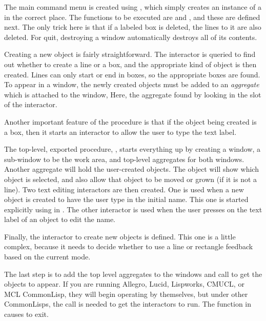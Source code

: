 The main command menu is created using , which simply
creates an instance of a  in the
correct place.  The functions to be executed are  and
, and these are defined next.  The only trick here is that if a
labeled box is deleted, the lines to it are also deleted.  For quit,
destroying a window automatically destroys all of its contents.

Creating a new object is fairly straightforward.  The interactor is queried
to find out whether to create a line or a box, and the appropriate kind of
object is then created.  Lines can only start or end in boxes, so the
appropriate boxes are found.  To appear in a window, the newly created
objects must be added to an {\it aggregate} which is attached to the window,
Here, the aggregate found by looking in the  slot of
the interactor.

Another important feature of the  procedure is that if
the object being created is a box, then it starts an interactor to allow
the user to type the text label.

The top-level, exported procedure, , starts everything up by
creating a window,
a sub-window to be the work area, and top-level aggregates for both
windows.  Another aggregate will hold the user-created objects.  The
 object will show which object is selected, and also allow
that object to be moved or grown (if it is not a line).  Two text editing
interactors are then created.  One is used when a new object is created to
have the user type in the initial name.  This one is started explicitly
using  in .  The other
interactor is used when the user presses on the text label of an object to
edit the name.

Finally, the interactor to create new objects is defined.  This one is a
little complex, because it needs to decide whether to use a line or
rectangle feedback based on the current mode.

The last step is to add the top level aggregates to the windows and call
 to get the objects to appear.  If you are running Allegro, Lucid,
Lispworks, CMUCL, or MCL CommonLisp, they will begin operating by
themselves, but under other CommonLisps, the  call
is needed to get the interactors to run.  The
 function in  causes
 to exit.

\newpage{}
\begin{programexample}

\end{programexample}

